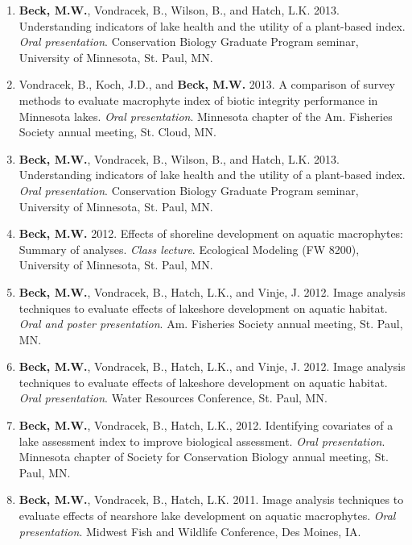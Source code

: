 \documentclass[letterpaper,12pt]{article}
\begin{document}
\begin{enumerate}
\item {\bf Beck, M.W.}, Vondracek, B., Wilson, B., and Hatch, L.K. 2013. Understanding indicators of lake health and the utility of a plant-based index. \textit{Oral presentation}. Conservation Biology Graduate Program seminar, University of Minnesota, St. Paul, MN.

\item Vondracek, B., Koch, J.D., and {\bf Beck, M.W.} 2013. A comparison of survey methods to evaluate macrophyte index of biotic integrity performance in Minnesota lakes. \textit{Oral presentation}. Minnesota chapter of the Am. Fisheries Society annual meeting, St. Cloud, MN.

\item {\bf Beck, M.W.}, Vondracek, B., Wilson, B., and Hatch, L.K. 2013. Understanding indicators of lake health and the utility of a plant-based index. \textit{Oral presentation}. Conservation Biology Graduate Program seminar, University of Minnesota, St. Paul, MN.

\item {\bf Beck, M.W.} 2012. Effects of shoreline development on aquatic macrophytes: Summary of analyses. \textit{Class lecture}. Ecological Modeling (FW 8200), University of Minnesota, St. Paul, MN.

\item {\bf Beck, M.W.}, Vondracek, B., Hatch, L.K., and Vinje, J. 2012. Image analysis techniques to evaluate effects of lakeshore development on aquatic habitat. \textit{Oral and poster presentation}. Am. Fisheries Society annual meeting, St. Paul, MN.

\item {\bf Beck, M.W.}, Vondracek, B., Hatch, L.K., and Vinje, J. 2012. Image analysis techniques to evaluate effects of lakeshore development on aquatic habitat. \textit{Oral presentation}. Water Resources Conference, St. Paul, MN.

\item {\bf Beck, M.W.}, Vondracek, B., Hatch, L.K., 2012. Identifying covariates of a lake assessment index to improve biological assessment. \textit{Oral presentation}. Minnesota chapter of Society for Conservation Biology annual meeting, St. Paul, MN.

\item {\bf Beck, M.W.}, Vondracek, B., Hatch, L.K. 2011. Image analysis techniques to evaluate effects of nearshore lake development on aquatic macrophytes. \textit{Oral presentation}. Midwest Fish and Wildlife Conference, Des Moines, IA.


\end{enumerate}
\end{document}
